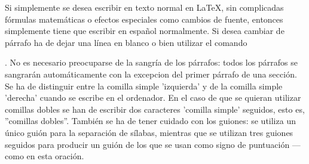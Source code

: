 \documentclass[a4paper,10pt]{letter}
\begin{document}
Si simplemente se desea escribir en texto normal en LaTeX,
sin complicadas fórmulas matemáticas o efectos especiales
como cambios de fuente, entonces simplemente tiene que escribir
en español normalmente.
Si desea cambiar de párrafo ha de dejar una línea en blanco o bien
utilizar el comando \par.
No es necesario preocuparse de la sangría de los párrafos:
todos los párrafos se sangrarán automáticamente con la excepcion
del primer párrafo de una sección.
Se ha de distinguir entre la comilla simple 'izquierda'
y de la comilla simple 'derecha' cuando se escribe en el ordenador.
En el caso de que se quieran utilizar comillas dobles se han de
escribir dos caracteres 'comilla simple' seguidos, esto es,
''comillas dobles''.
También se ha de tener cuidado con los guiones: se utiliza un único
guión para la separación de sílabas, mientras que se utilizan
tres guiones seguidos para producir un guión de los que se usan
como signo de puntuación --- como en esta oración.
\end{document}

